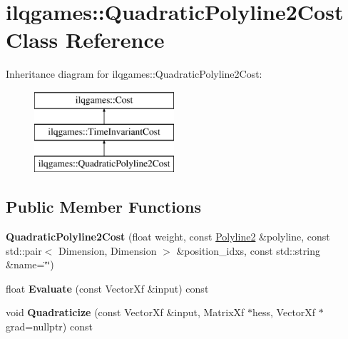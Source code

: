 \hypertarget{classilqgames_1_1_quadratic_polyline2_cost}{}\section{ilqgames\+:\+:Quadratic\+Polyline2\+Cost Class Reference}
\label{classilqgames_1_1_quadratic_polyline2_cost}
Inheritance diagram for ilqgames\+:\+:Quadratic\+Polyline2\+Cost\+:\begin{figure}[H]
\begin{center}
\leavevmode
\includegraphics[height=3.000000cm]{classilqgames_1_1_quadratic_polyline2_cost}
\end{center}
\end{figure}
\subsection*{Public Member Functions}
\begin{DoxyCompactItemize}
\item 
{\bfseries Quadratic\+Polyline2\+Cost} (float weight, const \hyperlink{classilqgames_1_1_polyline2}{Polyline2} \&polyline, const std\+::pair$<$ Dimension, Dimension $>$ \&position\+\_\+idxs, const std\+::string \&name=\char`\"{}\char`\"{})\hypertarget{classilqgames_1_1_quadratic_polyline2_cost_a3385f76e02730e44a9eb5b9ddfff7797}{}\label{classilqgames_1_1_quadratic_polyline2_cost_a3385f76e02730e44a9eb5b9ddfff7797}

\item 
float {\bfseries Evaluate} (const Vector\+Xf \&input) const \hypertarget{classilqgames_1_1_quadratic_polyline2_cost_a5925c379ffbb7ce5aa10ce50f230540a}{}\label{classilqgames_1_1_quadratic_polyline2_cost_a5925c379ffbb7ce5aa10ce50f230540a}

\item 
void {\bfseries Quadraticize} (const Vector\+Xf \&input, Matrix\+Xf $\ast$hess, Vector\+Xf $\ast$grad=nullptr) const \hypertarget{classilqgames_1_1_quadratic_polyline2_cost_aa6176115ed9df7e07d811bb47c5137e6}{}\label{classilqgames_1_1_quadratic_polyline2_cost_aa6176115ed9df7e07d811bb47c5137e6}

\end{DoxyCompactItemize}
